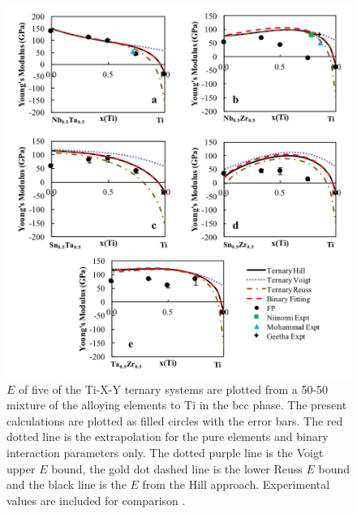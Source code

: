 \pagebreak
\begin{figure}[H]
	\centering
	\includegraphics[width=\textwidth]{Chapter-6/Figures/tixyyoungs2.png}
	\caption{$E$ of five of the Ti-X-Y ternary systems are plotted from a 50-50 mixture of the alloying elements to Ti in the bcc phase. The present calculations are plotted as filled circles with the error bars. The red dotted line is the extrapolation for the pure elements and binary interaction parameters only. The dotted purple line is the Voigt upper $E$ bound, the gold dot dashed line is the lower Reuss $E$ bound and the black line is the $E$ from the Hill approach. Experimental values are included for comparison \cite{Niinomi2012,Mohammed2014,Nozoe2007,Geetha2009}.}
	\label{Ch6-figure:tixyyoungs2}
\end{figure}

